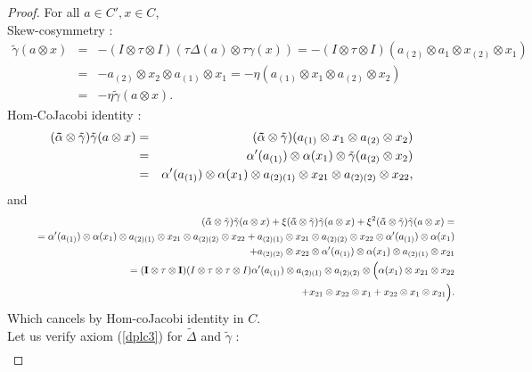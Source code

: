 \documentclass[10pt,a4paper]{amsart}
\begin{document}
\begin{proof} For all $a\in C', x\in C$,\\
Skew-cosymmetry :
\begin{eqnarray}
 \tilde\gamma(a\otimes x)
&=&-(I\otimes\tau\otimes I)(\tau\Delta(a)\otimes\tau\gamma(x))=-(I\otimes\tau\otimes I)(a_{(2)}\otimes a_{1}\otimes x_{(2)}\otimes x_{1})\nonumber\\
&=&-a_{(2)}\otimes x_{2}\otimes a_{(1)}\otimes x_{1}=-\eta(a_{(1)}\otimes x_{1}\otimes a_{(2)}\otimes x_{2})\nonumber\\
&=&-\eta\tilde\gamma(a\otimes x)\nonumber.
\end{eqnarray}
Hom-CoJacobi identity :
\begin{eqnarray}
 ({\bf \tilde\alpha}\otimes\tilde\gamma)\tilde\gamma(a\otimes x)&=&({\bf \tilde\alpha}\otimes\tilde\gamma)(a_{(1)}\otimes x_{1}\otimes a_{(2)}\otimes x_{2})\nonumber\\
&=&\alpha'(a_{(1)})\otimes \alpha(x_{1})\otimes\tilde\gamma(a_{(2)}\otimes x_{2})\nonumber\\
&=&\alpha'(a_{(1)})\otimes \alpha(x_{1})\otimes a_{(2)(1)}\otimes x_{21}\otimes a_{(2)(2)}\otimes x_{22},\nonumber
\end{eqnarray}
and
\begin{eqnarray}
 &&({\bf \tilde\alpha}\otimes\tilde\gamma)\tilde\gamma(a\otimes x)+\xi({\bf \tilde\alpha}\otimes\tilde\gamma)\tilde\gamma(a\otimes x)
+\xi^2({\bf \tilde\alpha}\otimes\tilde\gamma)\tilde\gamma(a\otimes x)=\nonumber\\
&&\qquad=\alpha'(a_{(1)})\otimes\alpha(x_{1})\otimes a_{(2)(1)}\otimes x_{21}\otimes a_{(2)(2)}\otimes x_{22}
+a_{(2)(1)}\otimes x_{21}\otimes a_{(2)(2)}\otimes x_{22}\otimes \alpha'(a_{(1)})\otimes \alpha(x_{1})\nonumber\\
&&\qquad\quad+a_{(2)(2)}\otimes x_{22}\otimes \alpha'(a_{(1)})\otimes\alpha(x_{1})\otimes a_{(2)(1)}\otimes x_{21}\nonumber\\
&&\qquad=({\bf I}\otimes \tau\otimes{\bf I})(I\otimes\tau\otimes\tau\otimes I)
\alpha'(a_{(1)})\otimes a_{(2)(1)}\otimes a_{(2)(2)}\otimes\Big(\alpha(x_{1})\otimes x_{21}\otimes x_{22}\nonumber\\
&&\qquad\quad+x_{21}\otimes x_{22}\otimes x_{1}+x_{22}\otimes x_{1}\otimes x_{21}\Big).\nonumber
\end{eqnarray}
Which cancels by Hom-coJacobi identity in $C$.\\
Let us verify axiom (\ref{dplc3}) for $\tilde\Delta$ and $\tilde\gamma$ :
\begin{eqnarray}

\end{eqnarray}
\end{proof}
\end{document}
